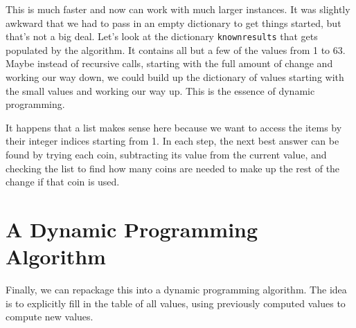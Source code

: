 This is much faster and now can work with much larger instances.
It was slightly awkward that we had to pass in an empty dictionary to get things started, but that's not a big deal.
Let's look at the dictionary \texttt{knownresults} that gets populated by the algorithm.
It contains all but a few of the values from 1 to 63.
Maybe instead of recursive calls, starting with the full amount of change and working our way down, we could build up the dictionary of values starting with the small values and working our way up.
This is the essence of dynamic programming.


It happens that a list makes sense here because we want to access the items by their integer indices starting from 1.
In each step, the next best answer can be found by trying each coin, subtracting its value from the current value, and checking the list to find how many coins are needed to make up the rest of the change if that coin is used.

\section{A Dynamic Programming Algorithm}


Finally, we can repackage this into a dynamic programming algorithm.
The idea is to explicitly fill in the table of all values, using previously computed values to compute new values.


